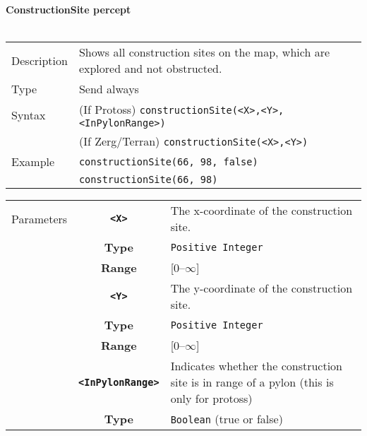 \noindent
\textbf{ConstructionSite percept}\\
\\
\begin{tabularx}{\textwidth}{lX}
 Description & Shows all construction sites on the map, which are explored and not obstructed. \\
 Type & Send always \\
 Syntax & (If Protoss) \verb|constructionSite(<X>,<Y>,<InPylonRange>)| \\
        & (If Zerg/Terran) \verb|constructionSite(<X>,<Y>)| \\
 Example & \verb|constructionSite(66, 98, false)| \\
         & \verb|constructionSite(66, 98)| \\
 \end{tabularx}
 \begin{tabularx}{\textwidth}{l | c | p{8cm}|}
 \cline{2-3} 
 Parameters & \textbf{\verb|<X>|} & The x-coordinate of the construction site.\\
            & \textbf{Type} & \verb|Positive Integer| \\
            & \textbf{Range} & [0--$\infty$] \\
            \cline{2-3} 
            & \textbf{\verb|<Y>|} & The y-coordinate of the construction site.\\
            & \textbf{Type} & \verb|Positive Integer| \\
            & \textbf{Range} & [0--$\infty$] \\
            \cline{2-3} 
            & \textbf{\verb|<InPylonRange>|} & Indicates whether the construction site is in range of a pylon (this is only for protoss)\\
            & \textbf{Type} & \verb|Boolean| (true or false) \\
            \cline{2-3} 
\end{tabularx} \\
